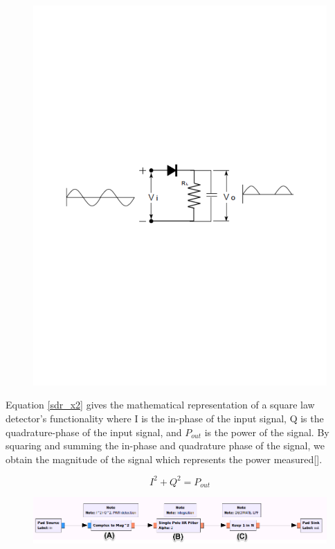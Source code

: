 {\begin{figure}[h!tb] 
\centering
\includegraphics[width=17cm]{Images/square_law.pdf}
\label{square_law_simple}
\end{figure}
}

Equation \ref{sdr_x2} gives the mathematical representation of a square law detector's functionality where I is the in-phase of the input signal, Q is the quadrature-phase of the input signal, and $P_{out}$ is the power of the signal.  By squaring and summing the in-phase and quadrature phase of the signal, we obtain the magnitude of the signal which represents the power measured[\cite{Rashid}].  

\begin{equation}\label{sdr_x2}
I^2+Q^2 = P_{out}
\end{equation}

{\begin{figure}[h!tb] 
\centering
\includegraphics[width=17cm]{Images/TPR_grc.png}
\label{square_block}
\end{figure}
}

